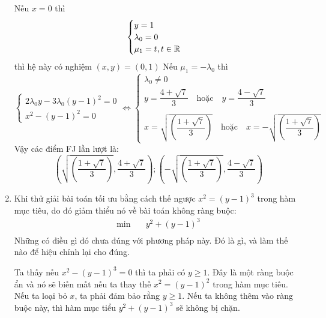 \begin{solution}
\begin{enumerate}[label=(\alph*)]
\begin{itemize}
    \end{itemize}
    Nếu $x = 0$ thì 
    \begin{equation}
        \begin{cases}
            y = 1\\
            \lambda_0 = 0\\
            \mu_1 = t, t \in \mathbb{R}
        \end{cases}
    \end{equation}
     thì hệ này có nghiệm $(x, y) = (0,1)$
     Nếu $\mu_1 = -\lambda_0$ thì
    \begin{equation}
        \begin{cases}
            2\lambda_0y - 3\lambda_0(y-1)^2 = 0\\
            x^2 - (y-1)^2 = 0
        \end{cases}
        \Leftrightarrow
        \begin{cases}
            \lambda_0 \ne 0 \\ 
            y = \dfrac{4+\sqrt{7}}{3}\quad\text{hoặc}\quad y = \dfrac{4-\sqrt{7}}{3} \\\\
            x = \sqrt{\left(\dfrac{1+\sqrt{7}}{3}\right)}\quad\text{hoặc}\quad x = -\sqrt{\left(\dfrac{1+\sqrt{7}}{3}\right)}
        \end{cases}
    \end{equation}
    Vậy các điểm FJ lần lượt là:
    \begin{equation}
        \left(\sqrt{\left(\dfrac{1+\sqrt{7}}{3}\right)}, \dfrac{4+\sqrt{7}}{3}\right); \left(-\sqrt{\left(\dfrac{1+\sqrt{7}}{3}\right)}, \dfrac{4-\sqrt{7}}{3}\right)
    \end{equation}
    \item Khi thử giải bài toán tối ưu bằng cách thế ngược $x^2 = (y - 1)^3$ trong hàm mục tiêu, do đó giảm thiểu nó về bài toán không ràng buộc:
    \begin{equation}
        \begin{aligned}
            \min \quad & y^2 + (y-1)^3\\
        \end{aligned}
    \end{equation}
    Những có điều gì đó chưa đúng với phương pháp này. Đó là gì, và làm thế nào để hiệu chỉnh lại cho đúng. 

    Ta thấy nếu $x^2 - (y - 1)^3 = 0$ thì ta phải có $y \geq 1$. Đây là một ràng buộc ẩn và nó sẽ biến mất nếu ta thay thế $x^2 = (y - 1)^2$ trong hàm mục tiêu. Nếu ta loại bỏ $x$, ta phải đảm bảo rằng $y \geq 1$. Nếu ta không thêm vào ràng buộc này, thì hàm mục tiểu $y^2 + (y-1)^3$ sẽ không bị chặn.
\end{enumerate}
\end{solution}
